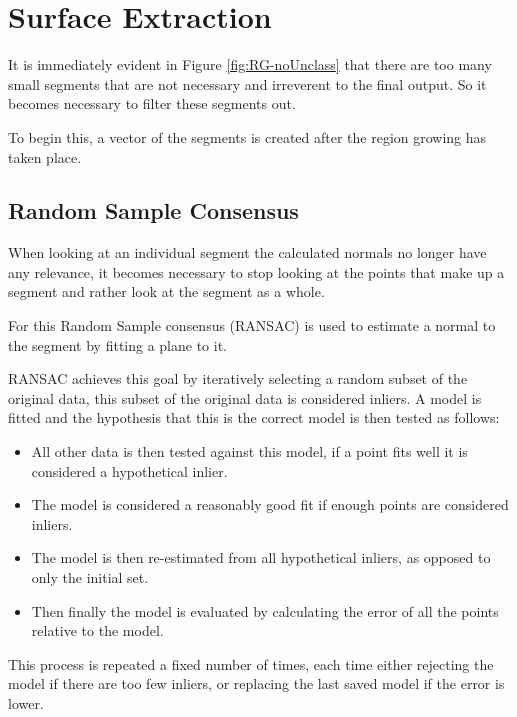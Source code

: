 	
\section{Surface Extraction}
	It is immediately evident in Figure \ref{fig:RG-noUnclass} that there are too many small segments that are not necessary and irreverent to the final output. So it becomes necessary to filter these segments out.
	
	To begin this, a vector of the segments is created after the region growing has taken place.
	
		\subsection{Random Sample Consensus}
		\label{RANSAC expl}
			When looking at an individual segment the calculated normals no longer have any relevance, it becomes necessary to stop looking at the points that make up a segment and rather look at the segment as a whole. 
			
			For this Random Sample consensus (RANSAC) is used to estimate a normal to the segment by fitting a plane to it.
			
			RANSAC achieves this goal by iteratively selecting a random subset of the original data, this subset of the original data is considered inliers. A model is fitted and the hypothesis that this is the correct model is then tested as follows:
			
			\begin{itemize}
				\item All other data is then tested against this model, if a point fits well it is considered a hypothetical inlier.
				
				\item The model is considered a reasonably good fit if enough points are considered inliers.
				
				\item The model is then re-estimated from all hypothetical inliers, as opposed to only the initial set.
				
				\item Then finally the model is evaluated by calculating the error of all the points relative to the model.
			\end{itemize}
			
			This process is repeated a fixed number of times, each time either rejecting the model if there are too few inliers, or replacing the last saved model if the error is lower.
			
